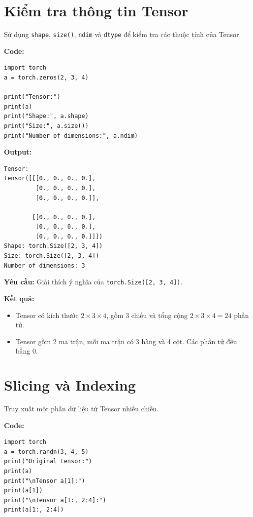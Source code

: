 \documentclass[12pt,a4paper]{article}
\begin{document}
\section{Kiểm tra thông tin Tensor}
Sử dụng \texttt{shape}, \texttt{size()}, \texttt{ndim} và \texttt{dtype} để kiểm tra các thuộc tính của Tensor.

\textbf{Code:}
\begin{verbatim}
import torch
a = torch.zeros(2, 3, 4)

print("Tensor:")
print(a)
print("Shape:", a.shape)
print("Size:", a.size())
print("Number of dimensions:", a.ndim)
\end{verbatim}

\textbf{Output:}
\begin{verbatim}
Tensor:
tensor([[[0., 0., 0., 0.],
         [0., 0., 0., 0.],
         [0., 0., 0., 0.]],

        [[0., 0., 0., 0.],
         [0., 0., 0., 0.],
         [0., 0., 0., 0.]]])
Shape: torch.Size([2, 3, 4])
Size: torch.Size([2, 3, 4])
Number of dimensions: 3
\end{verbatim}

\textbf{Yêu cầu:}
Giải thích ý nghĩa của \texttt{torch.Size([2, 3, 4])}.

\textbf{Kết quả:}
\begin{itemize}
    \item Tensor có kích thước $2 \times 3 \times 4$, gồm 3 chiều và tổng cộng $2 \times 3 \times 4 = 24$ phần tử.
    \item Tensor gồm 2 ma trận, mỗi ma trận có 3 hàng và 4 cột. Các phần tử đều bằng 0.
\end{itemize}

\section{Slicing và Indexing}
Truy xuất một phần dữ liệu từ Tensor nhiều chiều.

\textbf{Code:}
\begin{verbatim}
import torch
a = torch.randn(3, 4, 5)
print("Original tensor:")
print(a)
print("\nTensor a[1]:")
print(a[1])
print("\nTensor a[1:, 2:4]:")
print(a[1:, 2:4])
\end{verbatim}
\end{document}
